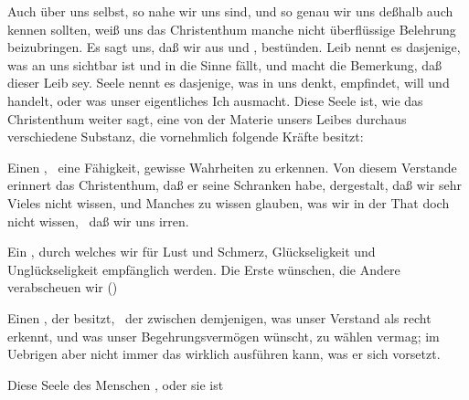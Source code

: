 \clearpage\linenumbers%
\def\dieserteilseiten{IIIb}

Auch über uns selbst, so nahe wir uns sind, und so genau wir uns deßhalb auch kennen sollten, weiß uns das Christenthum manche nicht überflüssige Belehrung beizubringen. Es sagt uns, daß wir aus  und , bestünden. Leib nennt es dasjenige, was an uns sichtbar ist und in die Sinne fällt, und macht die Bemerkung, daß dieser Leib  sey. Seele nennt es dasjenige, was in uns denkt, empfindet, will und handelt, oder was unser eigentliches Ich ausmacht. Diese Seele ist, wie das Christenthum weiter sagt, eine von der Materie unsers Leibes durchaus verschiedene Substanz, die vornehmlich folgende Kräfte besitzt:
\begin{aufzb}
\item Einen , \dh\ eine Fähigkeit, gewisse Wahrheiten zu erkennen. Von diesem Verstande erinnert das Christenthum, daß er seine Schranken habe, dergestalt, daß wir sehr Vieles nicht wissen, und Manches zu wissen glauben, was wir in der That doch nicht wissen, \dh\ daß wir uns irren.
\item Ein , durch welches wir für Lust und Schmerz, Glückseligkeit und Unglückseligkeit empfänglich werden. Die Erste wünschen, die Andere verabscheuen wir ()~
\item Einen , der  besitzt, \dh\ der zwischen demjenigen, was unser Verstand als recht erkennt, und was unser Begehrungsvermögen wünscht, zu wählen vermag; im Uebrigen aber nicht immer das wirklich ausführen kann, was er sich vorsetzt.
\end{aufzb}
Diese Seele des Menschen , oder sie ist 


